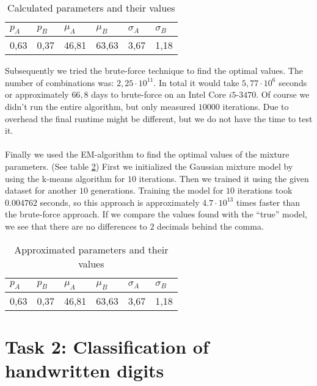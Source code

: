\documentclass{article}
\begin{document}
\begin{table}[H]
	\begin{center}
		\begin{tabular}{l|l|l|l|l|l}
			$p_A$ & $p_B$ & $\mu_A$ & $\mu_B$ & $\sigma_A$ & $\sigma_B$ \\
			\hline
			0,63 & 0,37 & 46,81 & 63,63 & 3,67 & 1,18 \\
		\end{tabular}
		\caption{Calculated parameters and their values}
		\label{table:data2}
	\end{center}
\end{table}

Subsequently we tried the brute-force technique to find the optimal values. The number of combinations was: $2,25 \cdot 10^{11}$. In total it would take $5,77 \cdot 10^6$ seconds or approximately $66,8$ days to brute-force on an Intel Core $i5$-$3470$. Of course we didn't run the entire algorithm, but only measured $10000$ iterations. Due to overhead the final runtime might be different, but we do not have the time to test it.\\\\

Finally we used the EM-algorithm to find the optimal values of the mixture parameters. (See table \ref{table:data3}) First we initialized the Gaussian mixture model by using the k-means algorithm for $10$ iterations. Then we trained it using the given dataset for another $10$ generations. Training the model for $10$ iterations took  $0.004762$ seconds, so this approach is approximately $4.7 \cdot 10^{13}$ times faster than the brute-force approach. If we compare the values found with the ``true'' model, we see that there are no differences to $2$ decimals behind the comma. 

\begin{table}[!h]
	\begin{center}
		\begin{tabular}{l|l|l|l|l|l}
			$p_A$ & $p_B$ & $\mu_A$ & $\mu_B$ & $\sigma_A$ & $\sigma_B$ \\
			\hline
			0,63 & 0,37 & 46,81 & 63,63 & 3,67 & 1,18 \\
		\end{tabular}
		\caption{Approximated parameters and their values}
		\label{table:data3}
	\end{center}
\end{table}


\section{Task 2: Classiﬁcation of handwritten digits}
\end{document}
